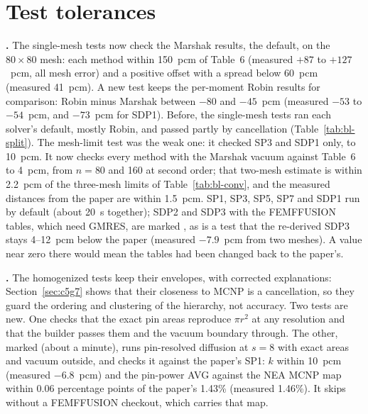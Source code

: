 \section{Test tolerances}
\label{sec:tests}

\textbf{.} The
single-mesh tests now check the Marshak results, the default, on the
$80 \times 80$ mesh: each method within 150~pcm of Table~6 (measured $+87$ to
$+127$~pcm, all mesh error) and a positive offset with a spread below 60~pcm
(measured 41~pcm). A new test keeps the per-moment Robin results for
comparison: Robin minus Marshak between $-80$ and $-45$~pcm (measured $-53$
to $-54$~pcm, and $-73$~pcm for SDP1). Before, the single-mesh tests ran each
solver's default, mostly Robin, and passed partly by cancellation
(Table~\ref{tab:bl-split}). The mesh-limit test was the
weak one: it checked SP3 and SDP1 only, to 10~pcm. It now checks every
method with the Marshak vacuum against Table~6 to 4~pcm, from $n = 80$ and
160 at second order; that two-mesh estimate is within 2.2~pcm of the
three-mesh limits of Table~\ref{tab:bl-conv}, and the measured distances from
the paper are within 1.5~pcm. SP1, SP3, SP5, SP7 and SDP1 run by default
(about 20~s together); SDP2 and SDP3 with the FEMFFUSION tables, which need
GMRES, are marked , as is a test that the re-derived SDP3 stays
4--12~pcm below the paper (measured $-7.9$~pcm from two meshes). A value
near zero there would mean the tables had been changed back to the paper's.

\textbf{.} The homogenized tests keep
their envelopes, with corrected explanations: Section~\ref{sec:c5g7} shows
that their closeness to MCNP is a cancellation, so they guard the ordering
and clustering of the hierarchy, not accuracy. Two tests are new. One checks
that the exact pin areas reproduce $\pi r^2$ at any resolution and that the
builder passes them and the vacuum boundary through. The other, marked
 (about a minute), runs pin-resolved diffusion at $s = 8$ with
exact areas and vacuum outside, and checks it against the paper's SP1: $k$
within 10~pcm (measured $-6.8$~pcm) and the pin-power AVG against the NEA
MCNP map within 0.06 percentage points of the paper's 1.43\% (measured
1.46\%). It skips without a FEMFFUSION checkout, which carries that map.
